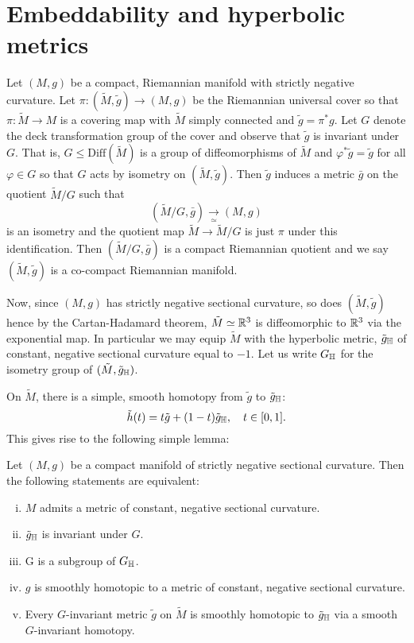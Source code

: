 \documentclass[a4paper,12pt]{amsart}
\begin{document}
\section{Embeddability and hyperbolic metrics}
\label{sec:embed_intg}

Let \((M, g)\) be a compact, Riemannian manifold with strictly negative curvature. Let \(\pi\colon (\tilde{M}, \tilde{g}) \to (M, g)\) be the Riemannian universal cover so that \(\pi : \tilde{M} \to M\) is a covering map with \(\tilde{M}\) simply connected and \(\tilde{g} = \pi^{\ast} g\). Let \(G\) denote the deck transformation group of the cover and observe that \(\tilde{g}\) is invariant under \(G\). That is, \(G \leq \text{Diff}(\tilde{M})\) is a group of diffeomorphisms of \(\tilde{M}\) and \(\varphi^{\ast} \tilde{g} = \tilde{g}\) for all \(\varphi \in G\) so that \(G\) acts by isometry on \((\tilde{M}, \tilde{g})\). Then \(\tilde{g}\) induces a metric \(\bar{g}\) on the quotient \(\tilde{M}/G\) such that
\[
(\tilde{M}/G, \bar{g}) \underset{\simeq}{\to} (M, g)
\]
is an isometry and the quotient map \(\tilde{M} \to \tilde{M}/G\) is just \(\pi\) under this identification. Then \((\tilde{M}/G, \bar{g})\) is a compact Riemannian quotient and we say \((\tilde{M}, \tilde{g})\) is a co-compact Riemannian manifold.

Now, since \((M, g)\) has strictly negative sectional curvature, so does \((\tilde{M}, \tilde{g})\) hence by the Cartan-Hadamard theorem, \(\tilde{M} \simeq \mathbb{R}^3\) is diffeomorphic to \(\mathbb{R}^3\) via the exponential map. In particular we may equip \(\tilde{M}\) with the hyperbolic metric, \(\tilde{g}_{\mathbb{H}}\) of constant, negative sectional curvature equal to \(-1\). Let us write \(G_{\mathbb{H}}\) for the isometry group of \((\tilde{M}, \tilde{g}_{\mathbb{H}})\).

On \(\tilde{M}\), there is a simple, smooth homotopy from \(\tilde{g}\) to \(\tilde{g}_{\mathbb{H}}\):
\[
\tilde{h}(t) = t\tilde{g} + (1-t)\tilde{g}_{\mathbb{H}}, \quad t \in [0, 1].
\]
This gives rise to the following simple lemma:

\begin{lemma}
\label{lem:const_neg}

Let \((M, g)\) be a compact manifold of strictly negative sectional curvature. Then the following statements are equivalent:
\begin{enumerate}[(i)]
\item \label{enum:neg_met} \(M\) admits a metric of constant, negative sectional curvature.
\item \label{enum:deck_met} \(\tilde{g}_{\mathbb{H}}\) is invariant under \(G\).
\item \label{enum:subgroup} G is a subgroup of \(G_{\mathbb{H}}\).
\item \label{enum:homo_met} \(g\) is smoothly homotopic to a metric of constant, negative sectional curvature.
\item \label{enum:homo_deck} Every \(G\)-invariant metric \(\tilde{g}\) on \(\tilde{M}\) is smoothly homotopic to \(\tilde{g}_{\mathbb{H}}\) via a smooth \(G\)-invariant homotopy.
\end{enumerate}
\end{lemma}
\end{document}
